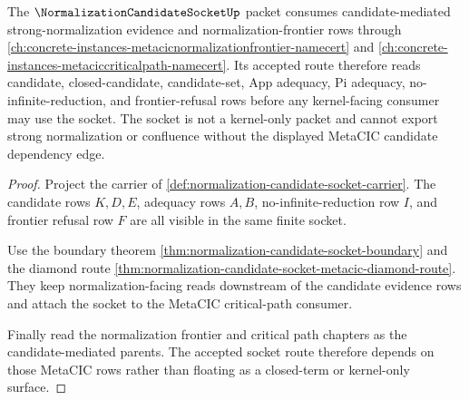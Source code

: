 \begin{theorem}
\label{thm:normalization-candidate-socket-metacic-candidate-dependency-route}
The $\NormalizationCandidateSocketUp$ packet consumes candidate-mediated strong-normalization evidence and normalization-frontier rows through \autoref{ch:concrete-instances-metacicnormalizationfrontier-namecert} and \autoref{ch:concrete-instances-metaciccriticalpath-namecert}. Its accepted route therefore reads candidate, closed-candidate, candidate-set, App adequacy, Pi adequacy, no-infinite-reduction, and frontier-refusal rows before any kernel-facing consumer may use the socket. The socket is not a kernel-only packet and cannot export strong normalization or confluence without the displayed MetaCIC candidate dependency edge.
\end{theorem}
\begin{proof}
Project the carrier of \autoref{def:normalization-candidate-socket-carrier}. The candidate rows $K,D,E$, adequacy rows $A,B$, no-infinite-reduction row $I$, and frontier refusal row $F$ are all visible in the same finite socket.

Use the boundary theorem \autoref{thm:normalization-candidate-socket-boundary} and the diamond route \autoref{thm:normalization-candidate-socket-metacic-diamond-route}. They keep normalization-facing reads downstream of the candidate evidence rows and attach the socket to the MetaCIC critical-path consumer.

Finally read the normalization frontier and critical path chapters as the candidate-mediated parents. The accepted socket route therefore depends on those MetaCIC rows rather than floating as a closed-term or kernel-only surface.
\end{proof}
